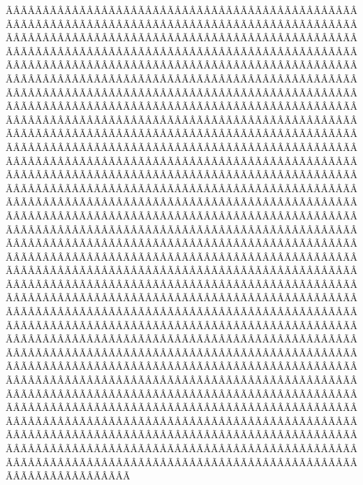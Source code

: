 \begin{sumilla}
\begin{fundamentacion}
ÃÂÃÂÃÂÃÂÃÂÃÂÃÂÃÂÃÂÃÂÃÂÃÂÃÂÃÂÃÂÃÂÃÂÃÂÃÂÃÂÃÂÃÂÃÂÃÂÃÂÃÂÃÂÃÂÃÂÃÂÃÂÃÂÃÂÃÂÃÂÃÂÃÂÃÂÃÂÃÂÃÂÃÂÃÂÃÂÃÂÃÂÃÂÃÂÃÂÃÂÃÂÃÂÃÂÃÂÃÂÃÂÃÂÃÂÃÂÃÂÃÂÃÂÃÂÃÂÃÂÃÂÃÂÃÂÃÂÃÂÃÂÃÂÃÂÃÂÃÂÃÂÃÂÃÂÃÂÃÂÃÂÃÂÃÂÃÂÃÂÃÂÃÂÃÂÃÂÃÂÃÂÃÂÃÂÃÂÃÂÃÂÃÂÃÂÃÂÃÂÃÂÃÂÃÂÃÂÃÂÃÂÃÂÃÂÃÂÃÂÃÂÃÂÃÂÃÂÃÂÃÂÃÂÃÂÃÂÃÂÃÂÃÂÃÂÃÂÃÂÃÂÃÂÃÂÃÂÃÂÃÂÃÂÃÂÃÂÃÂÃÂÃÂÃÂÃÂÃÂÃÂÃÂÃÂÃÂÃÂÃÂÃÂÃÂÃÂÃÂÃÂÃÂÃÂÃÂÃÂÃÂÃÂÃÂÃÂÃÂÃÂÃÂÃÂÃÂÃÂÃÂÃÂÃÂÃÂÃÂÃÂÃÂÃÂÃÂÃÂÃÂÃÂÃÂÃÂÃÂÃÂÃÂÃÂÃÂÃÂÃÂÃÂÃÂÃÂÃÂÃÂÃÂÃÂÃÂÃÂÃÂÃÂÃÂÃÂÃÂÃÂÃÂÃÂÃÂÃÂÃÂÃÂÃÂÃÂÃÂÃÂÃÂÃÂÃÂÃÂÃÂÃÂÃÂÃÂÃÂÃÂÃÂÃÂÃÂÃÂÃÂÃÂÃÂÃÂÃÂÃÂÃÂÃÂÃÂÃÂÃÂÃÂÃÂÃÂÃÂÃÂÃÂÃÂÃÂÃÂÃÂÃÂÃÂÃÂÃÂÃÂÃÂÃÂÃÂÃÂÃÂÃÂÃÂÃÂÃÂÃÂÃÂÃÂÃÂÃÂÃÂÃÂÃÂÃÂÃÂÃÂÃÂÃÂÃÂÃÂÃÂÃÂÃÂÃÂÃÂÃÂÃÂÃÂÃÂÃÂÃÂÃÂÃÂÃÂÃÂÃÂÃÂÃÂÃÂÃÂÃÂÃÂÃÂÃÂÃÂÃÂÃÂÃÂÃÂÃÂÃÂÃÂÃÂÃÂÃÂÃÂÃÂÃÂÃÂÃÂÃÂÃÂÃÂÃÂÃÂÃÂÃÂÃÂÃÂÃÂÃÂÃÂÃÂÃÂÃÂÃÂÃÂÃÂÃÂÃÂÃÂÃÂÃÂÃÂÃÂÃÂÃÂÃÂÃÂÃÂÃÂÃÂÃÂÃÂÃÂÃÂÃÂÃÂÃÂÃÂÃÂÃÂÃÂÃÂÃÂÃÂÃÂÃÂÃÂÃÂÃÂÃÂÃÂÃÂÃÂÃÂÃÂÃÂÃÂÃÂÃÂÃÂÃÂÃÂÃÂÃÂÃÂÃÂÃÂÃÂÃÂÃÂÃÂÃÂÃÂÃÂÃÂÃÂÃÂÃÂÃÂÃÂÃÂÃÂÃÂÃÂÃÂÃÂÃÂÃÂÃÂÃÂÃÂÃÂÃÂÃÂÃÂÃÂÃÂÃÂÃÂÃÂÃÂÃÂÃÂÃÂÃÂÃÂÃÂÃÂÃÂÃÂÃÂÃÂÃÂÃÂÃÂÃÂÃÂÃÂÃÂÃÂÃÂÃÂÃÂÃÂÃÂÃÂÃÂÃÂÃÂÃÂÃÂÃÂÃÂÃÂÃÂÃÂÃÂÃÂÃÂÃÂÃÂÃÂÃÂÃÂÃÂÃÂÃÂÃÂÃÂÃÂÃÂÃÂÃÂÃÂÃÂÃÂÃÂÃÂÃÂÃÂÃÂÃÂÃÂÃÂÃÂÃÂÃÂÃÂÃÂÃÂÃÂÃÂÃÂÃÂÃÂÃÂÃÂÃÂÃÂÃÂÃÂÃÂÃÂÃÂÃÂÃÂÃÂÃÂÃÂÃÂÃÂÃÂÃÂÃÂÃÂÃÂÃÂÃÂÃÂÃÂÃÂÃÂÃÂÃÂÃÂÃÂÃÂÃÂÃÂÃÂÃÂÃÂÃÂÃÂÃÂÃÂÃÂÃÂÃÂÃÂÃÂÃÂÃÂÃÂÃÂÃÂÃÂÃÂÃÂÃÂÃÂÃÂÃÂÃÂÃÂÃÂÃÂÃÂÃÂÃÂÃÂÃÂÃÂÃÂÃÂÃÂÃÂÃÂÃÂÃÂÃÂÃÂÃÂÃÂÃÂÃÂÃÂÃÂÃÂÃÂÃÂÃÂÃÂÃÂÃÂÃÂÃÂÃÂÃÂÃÂÃÂÃÂÃÂÃÂÃÂÃÂÃÂÃÂÃÂÃÂÃÂÃÂÃÂÃÂÃÂÃÂÃÂÃÂÃÂÃÂÃÂÃÂÃÂÃÂÃÂÃÂÃÂÃÂÃÂÃÂÃÂÃÂÃÂÃÂÃÂÃÂÃÂÃÂÃÂÃÂÃÂÃÂÃÂÃÂÃÂÃÂÃÂÃÂÃÂÃÂÃÂÃÂÃÂÃÂÃÂÃÂÃÂÃÂÃÂÃÂÃÂÃÂÃÂÃÂÃÂÃÂÃÂÃÂÃÂÃÂÃÂÃÂÃÂÃÂÃÂÃÂÃÂÃÂÃÂÃÂÃÂÃÂÃÂÃÂÃÂÃÂÃÂÃÂÃÂÃÂÃÂÃÂÃÂÃÂÃÂÃÂÃÂÃÂÃÂÃÂÃÂÃÂÃÂÃÂÃÂÃÂÃÂÃÂÃÂÃÂÃÂÃÂÃÂÃÂÃÂÃÂÃÂÃÂÃÂÃÂÃÂÃÂÃÂÃÂÃÂÃÂÃÂÃÂÃÂÃÂÃÂÃÂÃÂÃÂÃÂÃÂÃÂÃÂÃÂÃÂÃÂÃÂÃÂÃÂÃÂÃÂÃÂÃÂÃÂÃÂÃÂÃÂÃÂÃÂÃÂÃÂÃÂÃÂÃÂÃÂÃÂÃÂÃÂÃÂÃÂÃÂÃÂÃÂÃÂÃÂÃÂÃÂÃÂÃÂÃÂÃÂÃÂÃÂÃÂÃÂÃÂÃÂÃÂÃÂÃÂÃÂÃÂÃÂÃÂÃÂÃÂÃÂÃÂÃÂÃÂÃÂÃÂÃÂÃÂÃÂÃÂÃÂÃÂÃÂÃÂÃÂÃÂÃÂÃÂÃÂÃÂÃÂÃÂÃÂÃÂÃÂÃÂÃÂÃÂÃÂÃÂÃÂÃÂÃÂÃÂÃÂÃÂÃÂÃÂÃÂÃÂÃÂÃÂÃÂÃÂÃÂÃÂÃ
\end{fundamentacion}
\end{sumilla}
